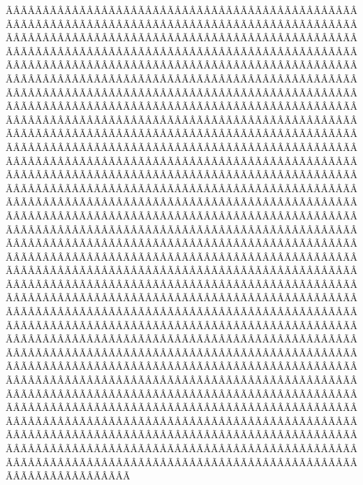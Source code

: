 \begin{sumilla}
\begin{fundamentacion}
ÃÂÃÂÃÂÃÂÃÂÃÂÃÂÃÂÃÂÃÂÃÂÃÂÃÂÃÂÃÂÃÂÃÂÃÂÃÂÃÂÃÂÃÂÃÂÃÂÃÂÃÂÃÂÃÂÃÂÃÂÃÂÃÂÃÂÃÂÃÂÃÂÃÂÃÂÃÂÃÂÃÂÃÂÃÂÃÂÃÂÃÂÃÂÃÂÃÂÃÂÃÂÃÂÃÂÃÂÃÂÃÂÃÂÃÂÃÂÃÂÃÂÃÂÃÂÃÂÃÂÃÂÃÂÃÂÃÂÃÂÃÂÃÂÃÂÃÂÃÂÃÂÃÂÃÂÃÂÃÂÃÂÃÂÃÂÃÂÃÂÃÂÃÂÃÂÃÂÃÂÃÂÃÂÃÂÃÂÃÂÃÂÃÂÃÂÃÂÃÂÃÂÃÂÃÂÃÂÃÂÃÂÃÂÃÂÃÂÃÂÃÂÃÂÃÂÃÂÃÂÃÂÃÂÃÂÃÂÃÂÃÂÃÂÃÂÃÂÃÂÃÂÃÂÃÂÃÂÃÂÃÂÃÂÃÂÃÂÃÂÃÂÃÂÃÂÃÂÃÂÃÂÃÂÃÂÃÂÃÂÃÂÃÂÃÂÃÂÃÂÃÂÃÂÃÂÃÂÃÂÃÂÃÂÃÂÃÂÃÂÃÂÃÂÃÂÃÂÃÂÃÂÃÂÃÂÃÂÃÂÃÂÃÂÃÂÃÂÃÂÃÂÃÂÃÂÃÂÃÂÃÂÃÂÃÂÃÂÃÂÃÂÃÂÃÂÃÂÃÂÃÂÃÂÃÂÃÂÃÂÃÂÃÂÃÂÃÂÃÂÃÂÃÂÃÂÃÂÃÂÃÂÃÂÃÂÃÂÃÂÃÂÃÂÃÂÃÂÃÂÃÂÃÂÃÂÃÂÃÂÃÂÃÂÃÂÃÂÃÂÃÂÃÂÃÂÃÂÃÂÃÂÃÂÃÂÃÂÃÂÃÂÃÂÃÂÃÂÃÂÃÂÃÂÃÂÃÂÃÂÃÂÃÂÃÂÃÂÃÂÃÂÃÂÃÂÃÂÃÂÃÂÃÂÃÂÃÂÃÂÃÂÃÂÃÂÃÂÃÂÃÂÃÂÃÂÃÂÃÂÃÂÃÂÃÂÃÂÃÂÃÂÃÂÃÂÃÂÃÂÃÂÃÂÃÂÃÂÃÂÃÂÃÂÃÂÃÂÃÂÃÂÃÂÃÂÃÂÃÂÃÂÃÂÃÂÃÂÃÂÃÂÃÂÃÂÃÂÃÂÃÂÃÂÃÂÃÂÃÂÃÂÃÂÃÂÃÂÃÂÃÂÃÂÃÂÃÂÃÂÃÂÃÂÃÂÃÂÃÂÃÂÃÂÃÂÃÂÃÂÃÂÃÂÃÂÃÂÃÂÃÂÃÂÃÂÃÂÃÂÃÂÃÂÃÂÃÂÃÂÃÂÃÂÃÂÃÂÃÂÃÂÃÂÃÂÃÂÃÂÃÂÃÂÃÂÃÂÃÂÃÂÃÂÃÂÃÂÃÂÃÂÃÂÃÂÃÂÃÂÃÂÃÂÃÂÃÂÃÂÃÂÃÂÃÂÃÂÃÂÃÂÃÂÃÂÃÂÃÂÃÂÃÂÃÂÃÂÃÂÃÂÃÂÃÂÃÂÃÂÃÂÃÂÃÂÃÂÃÂÃÂÃÂÃÂÃÂÃÂÃÂÃÂÃÂÃÂÃÂÃÂÃÂÃÂÃÂÃÂÃÂÃÂÃÂÃÂÃÂÃÂÃÂÃÂÃÂÃÂÃÂÃÂÃÂÃÂÃÂÃÂÃÂÃÂÃÂÃÂÃÂÃÂÃÂÃÂÃÂÃÂÃÂÃÂÃÂÃÂÃÂÃÂÃÂÃÂÃÂÃÂÃÂÃÂÃÂÃÂÃÂÃÂÃÂÃÂÃÂÃÂÃÂÃÂÃÂÃÂÃÂÃÂÃÂÃÂÃÂÃÂÃÂÃÂÃÂÃÂÃÂÃÂÃÂÃÂÃÂÃÂÃÂÃÂÃÂÃÂÃÂÃÂÃÂÃÂÃÂÃÂÃÂÃÂÃÂÃÂÃÂÃÂÃÂÃÂÃÂÃÂÃÂÃÂÃÂÃÂÃÂÃÂÃÂÃÂÃÂÃÂÃÂÃÂÃÂÃÂÃÂÃÂÃÂÃÂÃÂÃÂÃÂÃÂÃÂÃÂÃÂÃÂÃÂÃÂÃÂÃÂÃÂÃÂÃÂÃÂÃÂÃÂÃÂÃÂÃÂÃÂÃÂÃÂÃÂÃÂÃÂÃÂÃÂÃÂÃÂÃÂÃÂÃÂÃÂÃÂÃÂÃÂÃÂÃÂÃÂÃÂÃÂÃÂÃÂÃÂÃÂÃÂÃÂÃÂÃÂÃÂÃÂÃÂÃÂÃÂÃÂÃÂÃÂÃÂÃÂÃÂÃÂÃÂÃÂÃÂÃÂÃÂÃÂÃÂÃÂÃÂÃÂÃÂÃÂÃÂÃÂÃÂÃÂÃÂÃÂÃÂÃÂÃÂÃÂÃÂÃÂÃÂÃÂÃÂÃÂÃÂÃÂÃÂÃÂÃÂÃÂÃÂÃÂÃÂÃÂÃÂÃÂÃÂÃÂÃÂÃÂÃÂÃÂÃÂÃÂÃÂÃÂÃÂÃÂÃÂÃÂÃÂÃÂÃÂÃÂÃÂÃÂÃÂÃÂÃÂÃÂÃÂÃÂÃÂÃÂÃÂÃÂÃÂÃÂÃÂÃÂÃÂÃÂÃÂÃÂÃÂÃÂÃÂÃÂÃÂÃÂÃÂÃÂÃÂÃÂÃÂÃÂÃÂÃÂÃÂÃÂÃÂÃÂÃÂÃÂÃÂÃÂÃÂÃÂÃÂÃÂÃÂÃÂÃÂÃÂÃÂÃÂÃÂÃÂÃÂÃÂÃÂÃÂÃÂÃÂÃÂÃÂÃÂÃÂÃÂÃÂÃÂÃÂÃÂÃÂÃÂÃÂÃÂÃÂÃÂÃÂÃÂÃÂÃÂÃÂÃÂÃÂÃÂÃÂÃÂÃÂÃÂÃÂÃÂÃÂÃÂÃÂÃÂÃÂÃÂÃÂÃÂÃÂÃÂÃÂÃÂÃÂÃÂÃÂÃÂÃÂÃÂÃÂÃÂÃÂÃÂÃÂÃÂÃÂÃÂÃÂÃÂÃÂÃÂÃÂÃÂÃÂÃÂÃÂÃÂÃÂÃÂÃÂÃÂÃÂÃÂÃÂÃÂÃÂÃÂÃÂÃÂÃÂÃÂÃÂÃÂÃÂÃÂÃÂÃÂÃÂÃÂÃÂÃÂÃÂÃÂÃÂÃÂÃÂÃÂÃÂÃÂÃÂÃÂÃÂÃÂÃÂÃÂÃÂÃÂÃÂÃÂÃÂÃÂÃÂÃÂÃÂÃÂÃÂÃÂÃÂÃÂÃÂÃÂÃÂÃÂÃÂÃÂÃÂÃ
\end{fundamentacion}
\end{sumilla}
